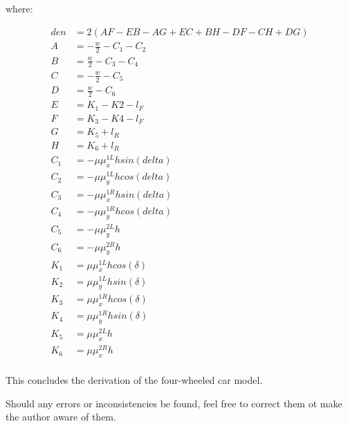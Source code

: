 \documentclass[paper=a4, fontsize=11pt]{scrartcl} %
\numberwithin{equation}{section} %
\numberwithin{figure}{section} %
\numberwithin{table}{section} %
\begin{document}
where:

\begin{align}
den &= 2(AF - EB - AG + EC + BH - DF - CH + DG) \\
A &= -\frac{w}{2} - C_1 - C_2 \\
B &= \frac{w}{2} - C_3 - C_4 \\
C &= -\frac{w}{2} - C_5 \\
D &= \frac{w}{2} - C_6 \\
E &= K_1 - K2 - l_F \\
F &= K_3 - K4 - l_F \\
G &= K_5 + l_R \\
H &= K_6 + l_R \\
C_1 &= -\mu \mu^{1L}_x h sin(delta) \\
C_2 &= -\mu \mu^{1L}_y h cos(delta) \\
C_3 &= -\mu \mu^{1R}_x h sin(delta) \\
C_4 &= -\mu \mu^{1R}_y h cos(delta) \\
C_5 &= -\mu \mu^{2L}_y h  \\
C_6 &= -\mu \mu^{2R}_y h  \\
K_1 &= \mu \mu^{1L}_x h cos(\delta) \\
K_2 &= \mu \mu^{1L}_y h sin(\delta) \\
K_3 &= \mu \mu^{1R}_x h cos(\delta) \\
K_4 &= \mu \mu^{1R}_y h sin(\delta) \\
K_5 &= \mu \mu^{2L}_x h \\
K_6 &= \mu \mu^{2R}_x h \\
\end{align}

This concludes the derivation of the four-wheeled car model.


Should any errors or inconsistencies be found, feel free to correct them ot make the author aware of them.



\end{document}
